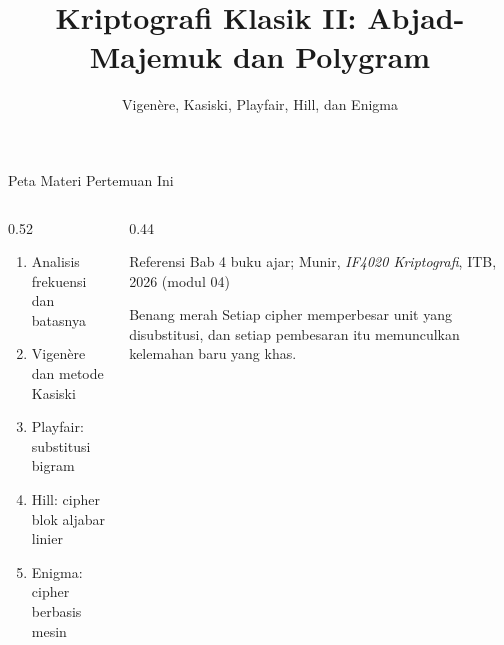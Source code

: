 \documentclass[aspectratio=169,11pt]{beamer}
\title{Kriptografi Klasik II: Abjad-Majemuk dan Polygram}
\subtitle{Vigen\`ere, Kasiski, Playfair, Hill, dan Enigma}
\begin{document}
\begin{frame}[plain]
    \titlepage
\end{frame}

\begin{frame}{Peta Materi Pertemuan Ini}
    \begin{columns}[T,onlytextwidth]
        \begin{column}{0.52\textwidth}
            \begin{enumerate}
                \item Analisis frekuensi dan batasnya
                \item Vigen\`ere dan metode Kasiski
                \item Playfair: substitusi bigram
                \item Hill: cipher blok aljabar linier
                \item Enigma: cipher berbasis mesin
            \end{enumerate}
        \end{column}
        \begin{column}{0.44\textwidth}
            \begin{block}{Referensi}
                \footnotesize
                Bab 4 buku ajar; Munir, \textit{IF4020 Kriptografi},
                ITB, 2026 (modul 04)
            \end{block}
            \begin{exampleblock}{Benang merah}
                \footnotesize
                Setiap cipher memperbesar unit yang disubstitusi, dan setiap
                pembesaran itu memunculkan kelemahan baru yang khas.
            \end{exampleblock}
        \end{column}
    \end{columns}
\end{frame}
\end{document}
